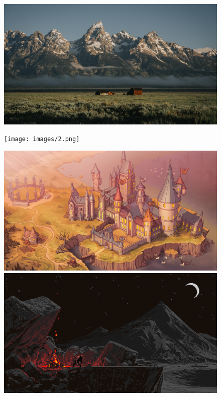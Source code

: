 \begin{figure}[hbt!]
\centering
\begin{minipage}{0.49\textwidth}
\centering
  \includegraphics[width=\textwidth]{images/1.jpg}
\end{minipage}
\begin{minipage}{0.49\textwidth}
\centering
  \texttt{[image: images/2.png]}
\end{minipage}
\begin{minipage}{0.49\textwidth}
\centering
  \includegraphics[width=\textwidth]{images/3.png}
\end{minipage}
\begin{minipage}{0.49\textwidth}
\centering
  \includegraphics[width=\textwidth]{images/4.png}
\end{minipage}
\end{figure}

\newpage
